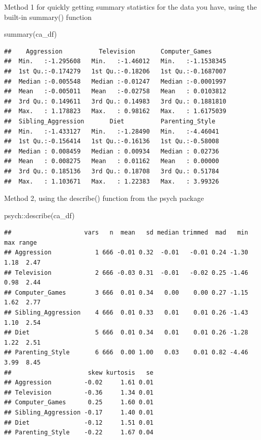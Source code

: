 \documentclass[
]{book}
\newenvironment{Shaded}{\begin{snugshade}}{\end{snugshade}}
\newcommand{\FunctionTok}[1]{\textcolor[rgb]{0.00,0.00,0.00}{#1}}
\newcommand{\NormalTok}[1]{#1}
\newcommand{\SpecialCharTok}[1]{\textcolor[rgb]{0.00,0.00,0.00}{#1}}
\begin{document}
Method 1 for quickly getting summary statistics for the data you have, using the built-in summary() function

\begin{Shaded}
\begin{Highlighting}[]
\FunctionTok{summary}\NormalTok{(ca\_df)}
\end{Highlighting}
\end{Shaded}

\begin{verbatim}
##    Aggression          Television       Computer_Games      
##  Min.   :-1.295608   Min.   :-1.46012   Min.   :-1.1538345  
##  1st Qu.:-0.174279   1st Qu.:-0.18206   1st Qu.:-0.1687007  
##  Median :-0.005548   Median :-0.01247   Median :-0.0001997  
##  Mean   :-0.005011   Mean   :-0.02758   Mean   : 0.0103812  
##  3rd Qu.: 0.149611   3rd Qu.: 0.14983   3rd Qu.: 0.1881810  
##  Max.   : 1.178823   Max.   : 0.98162   Max.   : 1.6175039  
##  Sibling_Aggression       Diet          Parenting_Style   
##  Min.   :-1.433127   Min.   :-1.28490   Min.   :-4.46041  
##  1st Qu.:-0.156414   1st Qu.:-0.16136   1st Qu.:-0.58008  
##  Median : 0.008459   Median : 0.00934   Median : 0.02736  
##  Mean   : 0.008275   Mean   : 0.01162   Mean   : 0.00000  
##  3rd Qu.: 0.185136   3rd Qu.: 0.18708   3rd Qu.: 0.51784  
##  Max.   : 1.103671   Max.   : 1.22383   Max.   : 3.99326
\end{verbatim}

Method 2, using the describe() function from the psych package

\begin{Shaded}
\begin{Highlighting}[]
\NormalTok{psych}\SpecialCharTok{::}\FunctionTok{describe}\NormalTok{(ca\_df)}
\end{Highlighting}
\end{Shaded}

\begin{verbatim}
##                    vars   n  mean   sd median trimmed  mad   min  max range
## Aggression            1 666 -0.01 0.32  -0.01   -0.01 0.24 -1.30 1.18  2.47
## Television            2 666 -0.03 0.31  -0.01   -0.02 0.25 -1.46 0.98  2.44
## Computer_Games        3 666  0.01 0.34   0.00    0.00 0.27 -1.15 1.62  2.77
## Sibling_Aggression    4 666  0.01 0.33   0.01    0.01 0.26 -1.43 1.10  2.54
## Diet                  5 666  0.01 0.34   0.01    0.01 0.26 -1.28 1.22  2.51
## Parenting_Style       6 666  0.00 1.00   0.03    0.01 0.82 -4.46 3.99  8.45
##                     skew kurtosis   se
## Aggression         -0.02     1.61 0.01
## Television         -0.36     1.34 0.01
## Computer_Games      0.25     1.60 0.01
## Sibling_Aggression -0.17     1.40 0.01
## Diet               -0.12     1.51 0.01
## Parenting_Style    -0.22     1.67 0.04
\end{verbatim}
\end{document}
